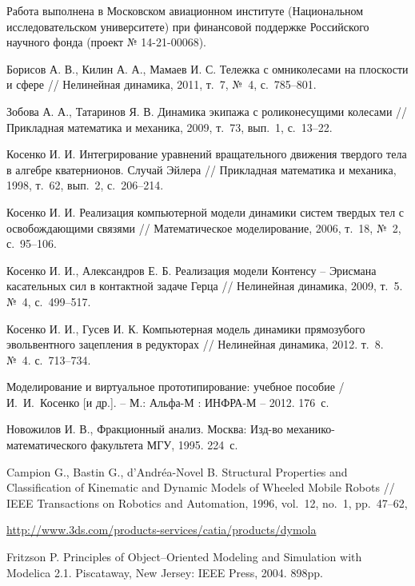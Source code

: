 \documentclass[12pt,a4paper]{article}
\begin{document}
Работа выполнена в Московском авиационном институте (Национальном 
исследовательском университете) при финансовой поддержке Российского
научного фонда (проект № 14-21-00068).

\bigskip
\bigskip

\begin{thebibliography}{99}

\Russian
{}
Борисов А. В., Килин А. А., Мамаев И. С. Тележка с омниколесами на плоскости и 
сфере // Нелинейная динамика, 2011, т.~7, №~4, с.~785--801.

Зобова А. А., Татаринов Я. В. Динамика экипажа с роликонесущими колесами // 
Прикладная математика и механика, 2009, т.~73, вып.~1, с.~13--22.

Косенко И. И. Интегрирование уравнений вращательного движения твердого тела в 
алгебре кватернионов. Случай Эйлера // Прикладная математика и механика, 1998, 
т.~62, вып.~2, с.~206--214.

Косенко И. И. Реализация компьютерной модели динамики систем твердых тел с 
освобождающими связями // Математическое моделирование, 2006, т.~18, №~2, 
с.~95--106.

Косенко И. И., Александров Е. Б. Реализация модели Контенсу -- Эрисмана 
касательных сил в контактной задаче Герца // Нелинейная динамика, 2009, т.~5. 
№~4, с.~499--517.

Косенко И. И., Гусев И. К. Компьютерная модель динамики прямозубого 
эвольвентного зацепления в редукторах // Нелинейная динамика, 2012. т.~8. №~4. 
с.~713--734.

Моделирование и виртуальное прототипирование: учебное пособие / И.~И.~Косенко 
[и др.]. -- М.: Альфа-М : ИНФРА-М – 2012. 176~с.

Новожилов И. В., Фракционный анализ. Москва: Изд-во механико-математического
факультета МГУ, 1995. 224~с.

\English
{}
Campion G., Bastin G., d'Andr\'ea-Novel B. Structural Properties and 
Classification of Kinematic and Dynamic Models of Wheeled Mobile Robots // IEEE 
Transactions on Robotics and Automation, 1996, vol.~12, no.~1, pp.~47--62,

\url{http://www.3ds.com/products-services/catia/products/dymola}

Fritzson P. Principles of Object--Oriented Modeling and Simulation with 
Modelica 2.1. Piscataway, New Jersey: IEEE Press, 2004. 898pp.


\end{thebibliography}
\end{document}

